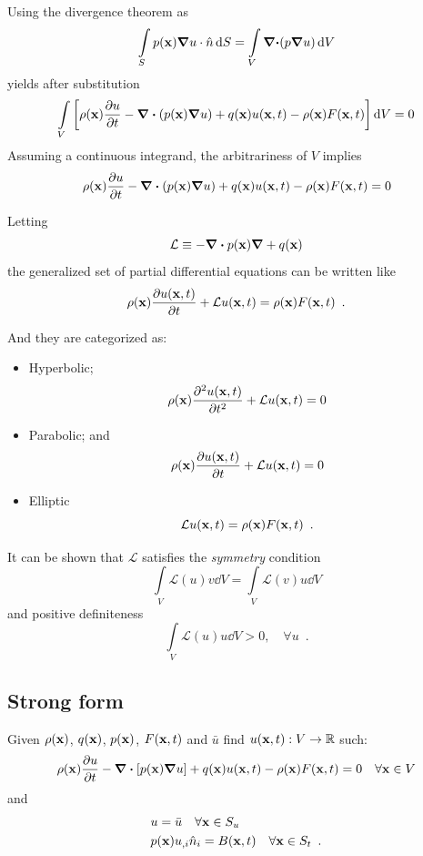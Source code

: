 Using the divergence theorem as
\[\int\limits_S p(\vb x) \grad u \cdot \hat n \dd{S}  = \int\limits_V \vb \div  (p\vb \grad u)\dd{V}\]
yields after substitution
\[\int\limits_V \left[\rho (\vb x)\pdv{u}{t} - \div (p(\vb x)\grad u) + q(\vb x)u(\vb x, t) - \rho (\vb x)F(\vb x, t)\right]\dd{V}  = 0\]
Assuming a continuous integrand, the arbitrariness of $V$ implies
\[\rho (\vb x)\pdv{u}{t} - \div(p(\vb x)\grad u) + q(\vb x)u(\vb x, t) - \rho (\vb x)F(\vb x, t) = 0\]

Letting
\[\mathcal{L} \equiv  - \div p(\vb x)\grad + q(\vb x)\]
the generalized set of partial differential equations can be written like
\begin{equation}
\rho(\vb x) \pdv{u(\vb x, t)}{t} + \mathcal{L}u(\vb x, t) = \rho (\vb x)F(\vb x, t) \enspace .
\label{eq:GenPDE}
\end{equation}

And they are categorized as:
\begin{itemize}
    \item Hyperbolic;
    \[\rho(\vb x) \pdv[2]{u(\vb x, t)}{t} + \mathcal{L}u(\vb x,t) = 0\]

    \item Parabolic; and
    \[\rho(\vb x) \pdv{u(\vb x,t)}{t} + \mathcal{L}u(\vb x, t) = 0\]

    \item Elliptic
    \[\mathcal{L}u(\vb x, t) = \rho (\vb x)F(\vb x, t) \enspace .\]
\end{itemize}

It can be shown that $\mathcal{L}$ satisfies the \emph{symmetry} condition
\[\int\limits_V \mathcal{L}(u)v\dd{V} =  \int\limits_V \mathcal{L}(v)u \dd{V}\]
and positive definiteness \cite{book:sepulveda_fismat, book:arfken}
\[\int\limits_V \mathcal{L}(u)u\dd{V}  > 0, \quad \forall u \enspace .\]

\subsection*{Strong form}
Given $\rho(\vb x)$, $q(\vb x)$, $p(\vb x)$, $F(\vb x, t)$ and $\bar u$ find $u(\vb x , t):V \to \mathbb{R}$ such:
\[\rho(\vb x) \pdv{u}{t} - \div \left[p(\vb x) \grad u\right] + q(\vb x) u(\vb x, t) - \rho(\vb x) F(\vb x, t) = 0 \quad \forall \vb x \in V \]
and
\begin{align*}
    &u = \bar u \quad \forall \vb x \in S_u\\
    &p(\vb x)u_{,i} \hat n_i= B(\vb x,t)\quad \forall \vb x \in  S_t \enspace .
\end{align*}



